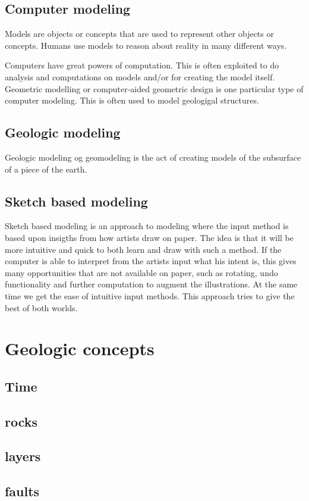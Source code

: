 \documentclass[a4paper,10pt]{article}
\begin{document}
\subsection{Computer modeling}
Models are objects or concepts that are used to represent other objects or concepts. Humans use models to reason about reality in many different ways.

Computers have great powers of computation. This is often exploited to do analysis and computations on models and/or for creating the model itself. Geometric modelling or computer-aided geometric design is one particular type of computer modeling. This is often used to model geologigal structures.

\subsection{Geologic modeling}
Geologic modeling og geomodeling is the act of creating models of the subsurface of a piece of the earth.

\subsection{Sketch based modeling}
Sketch based modeling is an approach to modeling where the input method is based upon insigths from how artists draw on paper. The idea is that it will be more intuitive and quick to both learn and draw with such a method. If the computer is able to interpret from the artists input what his intent is, this gives many opportunities that are not available on paper, such as rotating, undo functionality and further computation to augment the illustrations. At the same time we get the ease of intuitive input methods. This approach tries to give the best of both worlds.


\section{Geologic concepts}
\subsection{Time}
\subsection{rocks}
\subsection{layers}
\subsection{faults}
\end{document}
